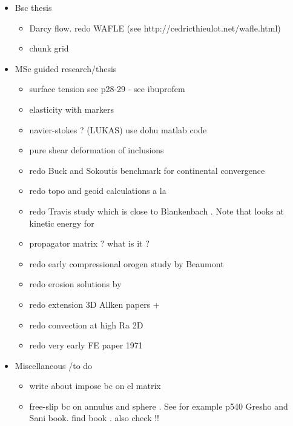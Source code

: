 
\begin{itemize}
\item Bsc thesis
\begin{itemize} 
\item Darcy flow. redo WAFLE (see http://cedricthieulot.net/wafle.html)
\item chunk grid
\end{itemize}
\item MSc guided research/thesis
\begin{itemize} 
\item surface tension see \cite{reddybook2}p28-29 - see ibuprofem 
\item elasticity with markers
\item navier-stokes ? (LUKAS) use dohu matlab code
\item pure shear deformation of inclusions \cite{trla00}
\item redo Buck and Sokoutis benchmark for continental convergence \cite{buso94}
\item redo topo and geoid calculations a la \cite{king09}
\item redo Travis study \cite{trab90} which is close to Blankenbach \cite{blbc89}. Note that \cite{maie12} looks at kinetic energy for \cite{trab90} 
\item propagator matrix ? what is it ? \cite{ribe18} \mscthesis {}  
\Literature \cite{haoc78,haoc81,riha84,zhon96,como97,mohc98,zhzu00,lezh08,leha08,mofm07,wuch08,mibb09,fope91,lizh13,bugo94} 
\item redo early compressional orogen study by Beaumont \cite{bequ94}
\item redo erosion solutions by \cite{cull60} \mscthesis {} 
\item redo extension 3D Allken papers + \cite{poay84,katl95} 
\item redo convection at high Ra 2D \cite{scan85}
\item redo very early FE paper 1971 \cite{stbe71}
\end{itemize}
\item Miscellaneous /to do
\begin{itemize} 
\item write about impose bc on el matrix
\item free-slip bc on annulus and sphere . See for example p540 Gresho and Sani book. find book \cite{deab72}.
also check \cite{ensa82} !!

\end{itemize}
\end{itemize}
